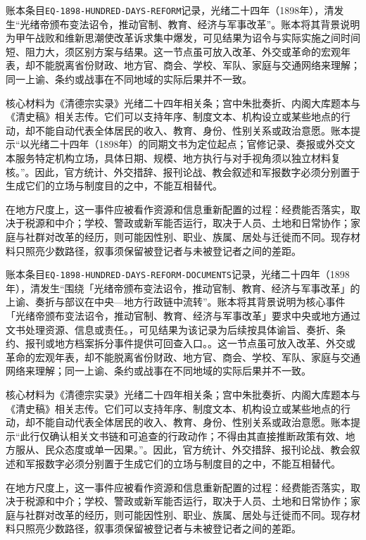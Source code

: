 账本条目\texttt{EQ-1898-HUNDRED-DAYS-REFORM}记录，光绪二十四年（1898年），清发生“光绪帝颁布变法诏令，推动官制、教育、经济与军事改革”。账本将其背景说明为甲午战败和维新思潮使改革诉求集中爆发，可见结果为诏令与实际实施之间时间短、阻力大，须区别方案与结果。这一节点虽可放入改革、外交或革命的宏观年表，却不能脱离省份财政、地方官、商会、学校、军队、家庭与交通网络来理解；同一上谕、条约或战事在不同地域的实际后果并不一致。

核心材料为《清德宗实录》光绪二十四年相关条；宫中朱批奏折、内阁大库题本与《清史稿》相关志传。它们可以支持年序、制度文本、机构设立或某些地点的行动，却不能自动代表全体居民的收入、教育、身份、性别关系或政治意愿。账本提示“以光绪二十四年（1898年）的同期文书为定位起点；官修记录、奏报或外交文本服务特定机构立场，具体日期、规模、地方执行与对手视角须以独立材料复核。”。因此，官方统计、外交措辞、报刊论战、教会叙述和军报数字必须分别置于生成它们的立场与制度目的之中，不能互相替代。

在地方尺度上，这一事件应被看作资源和信息重新配置的过程：经费能否落实，取决于税源和中介；学校、警政或新军能否运行，取决于人员、土地和日常协作；家庭与社群对改革的经历，则可能因性别、职业、族属、居处与迁徙而不同。现存材料只照亮少数路径，叙事须保留被登记者与未被登记者之间的差距。

账本条目\texttt{EQ-1898-HUNDRED-DAYS-REFORM-DOCUMENTS}记录，光绪二十四年（1898年），清发生“围绕「光绪帝颁布变法诏令，推动官制、教育、经济与军事改革」的上谕、奏折与部议在中央—地方行政链中流转”。账本将其背景说明为核心事件「光绪帝颁布变法诏令，推动官制、教育、经济与军事改革」要求中央或地方通过文书处理资源、信息或责任。，可见结果为该记录为后续按具体谕旨、奏折、条约、报刊或地方档案拆分事件提供可回查入口。。这一节点虽可放入改革、外交或革命的宏观年表，却不能脱离省份财政、地方官、商会、学校、军队、家庭与交通网络来理解；同一上谕、条约或战事在不同地域的实际后果并不一致。

核心材料为《清德宗实录》光绪二十四年相关条；宫中朱批奏折、内阁大库题本与《清史稿》相关志传。它们可以支持年序、制度文本、机构设立或某些地点的行动，却不能自动代表全体居民的收入、教育、身份、性别关系或政治意愿。账本提示“此行仅确认相关文书链和可追查的行政动作；不得由其直接推断政策有效、地方服从、民众态度或单一因果。”。因此，官方统计、外交措辞、报刊论战、教会叙述和军报数字必须分别置于生成它们的立场与制度目的之中，不能互相替代。

在地方尺度上，这一事件应被看作资源和信息重新配置的过程：经费能否落实，取决于税源和中介；学校、警政或新军能否运行，取决于人员、土地和日常协作；家庭与社群对改革的经历，则可能因性别、职业、族属、居处与迁徙而不同。现存材料只照亮少数路径，叙事须保留被登记者与未被登记者之间的差距。

